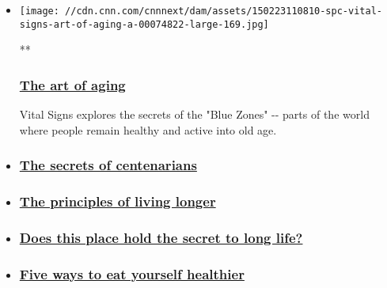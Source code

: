 \begin{itemize}
\item
  \href{/videos/world/2015/02/20/spc-vital-signs-art-of-aging-a.cnn}{}

  \texttt{[image: //cdn.cnn.com/cnnnext/dam/assets/150223110810-spc-vital-signs-art-of-aging-a-00074822-large-169.jpg]}

  **

  \hypertarget{the-art-of-aging}{%
  \subsubsection{\texorpdfstring{\href{/videos/world/2015/02/20/spc-vital-signs-art-of-aging-a.cnn}{The
  art of aging}}{The art of aging}}\label{the-art-of-aging}}

  Vital Signs explores the secrets of the "Blue Zones" -\/- parts of the
  world where people remain healthy and active into old age.
\item
  \hypertarget{the-secrets-of-centenarians}{%
  \subsubsection{\texorpdfstring{\href{/videos/world/2015/02/20/spc-vital-signs-art-of-aging-b.cnn}{The
  secrets of
  centenarians}}{The secrets of centenarians}}\label{the-secrets-of-centenarians}}
\item
  \hypertarget{the-principles-of-living-longer}{%
  \subsubsection{\texorpdfstring{\href{/videos/world/2015/02/20/spc-vital-signs-art-of-aging-c.cnn}{The
  principles of living
  longer}}{The principles of living longer}}\label{the-principles-of-living-longer}}
\item
  \hypertarget{does-this-place-hold-the-secret-to-long-life}{%
  \subsubsection{\texorpdfstring{\href{/2015/03/06/health/blue-zone-long-life-nicoya/index.html}{Does
  this place hold the secret to long
  life?}}{Does this place hold the secret to long life?}}\label{does-this-place-hold-the-secret-to-long-life}}
\item
  \hypertarget{five-ways-to-eat-yourself-healthier}{%
  \subsubsection{\texorpdfstring{\href{/2015/02/18/health/five-ways-to-eat-yourself-healthier/index.html}{Five
  ways to eat yourself
  healthier}}{Five ways to eat yourself healthier}}\label{five-ways-to-eat-yourself-healthier}}
\end{itemize}

